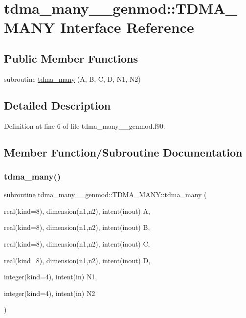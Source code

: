 \hypertarget{interfacetdma__many____genmod_1_1_t_d_m_a___m_a_n_y}{}\section{tdma\+\_\+many\+\_\+\+\_\+genmod\+::T\+D\+M\+A\+\_\+\+M\+A\+NY Interface Reference}
\label{interfacetdma__many____genmod_1_1_t_d_m_a___m_a_n_y}
\subsection*{Public Member Functions}
\begin{DoxyCompactItemize}
\item 
subroutine \mbox{\hyperlink{interfacetdma__many____genmod_1_1_t_d_m_a___m_a_n_y_a702e717f26cd2ffad1c7980cc5332e8c}{tdma\+\_\+many}} (A, B, C, D, N1, N2)
\end{DoxyCompactItemize}


\subsection{Detailed Description}


Definition at line 6 of file tdma\+\_\+many\+\_\+\+\_\+genmod.\+f90.



\subsection{Member Function/\+Subroutine Documentation}
\mbox{\label{interfacetdma__many____genmod_1_1_t_d_m_a___m_a_n_y_a702e717f26cd2ffad1c7980cc5332e8c}} 
\subsubsection{\texorpdfstring{tdma\_many()}{tdma\_many()}}
{\footnotesize\ttfamily subroutine tdma\+\_\+many\+\_\+\+\_\+genmod\+::\+T\+D\+M\+A\+\_\+\+M\+A\+N\+Y\+::tdma\+\_\+many (\begin{DoxyParamCaption}\item[{real(kind=8), dimension(n1,n2), intent(inout)}]{A,  }\item[{real(kind=8), dimension(n1,n2), intent(inout)}]{B,  }\item[{real(kind=8), dimension(n1,n2), intent(inout)}]{C,  }\item[{real(kind=8), dimension(n1,n2), intent(inout)}]{D,  }\item[{integer(kind=4), intent(in)}]{N1,  }\item[{integer(kind=4), intent(in)}]{N2 }\end{DoxyParamCaption})}



